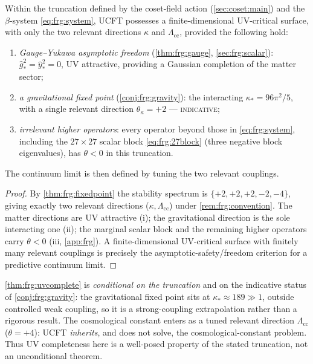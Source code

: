 \begin{theorem}
\label{thm:frg:uvcomplete}
Within the truncation defined by the coset-field action
(\autoref{sec:coset:main}) and the $\beta$-system \eqref{eq:frg:system}, UCFT
possesses a finite-dimensional UV-critical surface, with only the two
relevant directions $\kappa$ and $\Lambda_{\mathrm{cc}}$, provided the
following hold:
\begin{enumerate}
  \item[\textnormal{(i)}] \emph{Gauge--Yukawa asymptotic freedom}
        (\autoref{thm:frg:gauge}, \autoref{sec:frg:scalar}):
        $\hat g^{2}_{\ast}=\hat y^{2}_{\ast}=0$, UV attractive, providing
        a Gaussian completion of the matter sector;
  \item[\textnormal{(ii)}] \emph{a gravitational fixed point}
        (\autoref{conj:frg:gravity}): the interacting
        $\kappa_{\ast}=96\pi^{2}/5$, with a single relevant direction
        $\theta_{\kappa}=+2$ --- \textsc{indicative};
  \item[\textnormal{(iii)}] \emph{irrelevant higher operators}: every
        operator beyond those in \eqref{eq:frg:system}, including the
        $27\times27$ scalar block \eqref{eq:frg:27block} (three negative
        block eigenvalues), has $\theta<0$ in this truncation.
\end{enumerate}
The continuum limit is then defined by tuning the two relevant couplings.
\end{theorem}

\begin{proof}
By \autoref{thm:frg:fixedpoint} the stability spectrum is
$\{+2,+2,+2,-2,-4\}$, giving exactly two relevant directions
($\kappa,\Lambda_{\mathrm{cc}}$) under \autoref{rem:frg:convention}. The
matter directions are UV attractive (i); the gravitational direction is
the sole interacting one (ii); the marginal scalar block and the remaining
higher operators carry $\theta<0$ (iii, \autoref{app:frg}). A
finite-dimensional UV-critical surface with finitely many relevant
couplings is precisely the asymptotic-safety/freedom criterion for a
predictive continuum limit.
\end{proof}

\begin{remark}
\label{rem:frg:caveat}
\autoref{thm:frg:uvcomplete} is \emph{conditional on the truncation} and on
the indicative status of \autoref{conj:frg:gravity}: the gravitational
fixed point sits at $\kappa_{\ast}\approx189\gg1$, outside controlled weak
coupling, so it is a strong-coupling extrapolation rather than a rigorous
result. The cosmological constant enters as a tuned relevant direction
$\Lambda_{\mathrm{cc}}$ ($\theta=+4$): UCFT \emph{inherits}, and does not
solve, the cosmological-constant problem. Thus UV completeness here is a
well-posed property of the stated truncation, not an unconditional theorem.
\end{remark}
